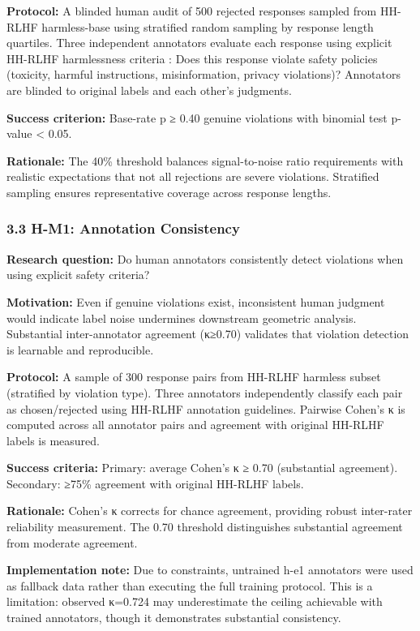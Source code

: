 \textbf{Protocol:} A blinded human audit of 500 rejected responses sampled from HH-RLHF harmless-base using stratified random sampling by response length quartiles. Three independent annotators evaluate each response using explicit HH-RLHF harmlessness criteria \citep{Baietal2022}: Does this response violate safety policies (toxicity, harmful instructions, misinformation, privacy violations)? Annotators are blinded to original labels and each other's judgments.

\textbf{Success criterion:} Base-rate p ≥ 0.40 genuine violations with binomial test p-value < 0.05.

\textbf{Rationale:} The 40\% threshold balances signal-to-noise ratio requirements with realistic expectations that not all rejections are severe violations. Stratified sampling ensures representative coverage across response lengths.

\subsubsection{3.3 H-M1: Annotation Consistency}

\textbf{Research question:} Do human annotators consistently detect violations when using explicit safety criteria?

\textbf{Motivation:} Even if genuine violations exist, inconsistent human judgment would indicate label noise undermines downstream geometric analysis. Substantial inter-annotator agreement (κ≥0.70) validates that violation detection is learnable and reproducible.

\textbf{Protocol:} A sample of 300 response pairs from HH-RLHF harmless subset (stratified by violation type). Three annotators independently classify each pair as chosen/rejected using HH-RLHF annotation guidelines. Pairwise Cohen's κ is computed across all annotator pairs and agreement with original HH-RLHF labels is measured.

\textbf{Success criteria:} Primary: average Cohen's κ ≥ 0.70 (substantial agreement). Secondary: ≥75\% agreement with original HH-RLHF labels.

\textbf{Rationale:} Cohen's κ corrects for chance agreement, providing robust inter-rater reliability measurement. The 0.70 threshold distinguishes substantial agreement from moderate agreement.

\textbf{Implementation note:} Due to constraints, untrained h-e1 annotators were used as fallback data rather than executing the full training protocol. This is a limitation: observed κ=0.724 may underestimate the ceiling achievable with trained annotators, though it demonstrates substantial consistency.

